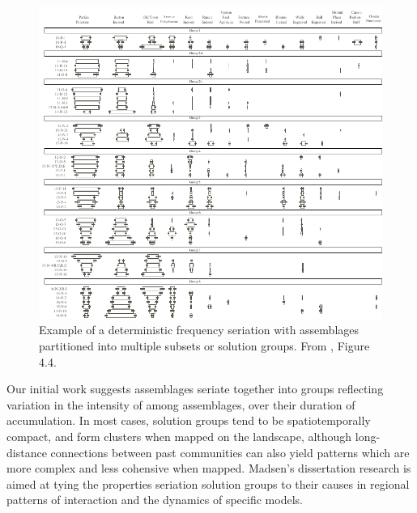 \begin{figure}
	\includegraphics[scale=0.75]{graphics/seriationcombinatorics/lipo-figure-4-4.pdf}
	\caption{Example of a deterministic frequency seriation with assemblages partitioned into multiple subsets or solution groups.  From \citet{Lipo2001}, Figure 4.4.}
	\label{fig:mult-seriation-groups}
\end{figure}

Our initial work suggests assemblages seriate together into groups reflecting variation in the intensity of \ct among assemblages, over their duration of accumulation. In most cases, solution groups tend to be spatiotemporally compact, and form clusters when mapped on the landscape, although long-distance connections between past communities can also yield patterns which are more complex and less cohensive when mapped.  Madsen's dissertation research is aimed at tying the properties seriation solution groups to their causes in regional patterns of interaction and the dynamics of specific \ct models.  

